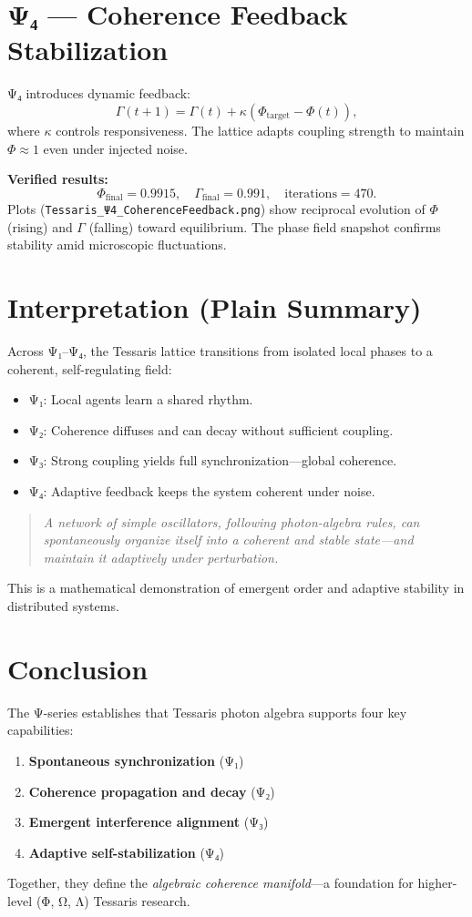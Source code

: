 \documentclass[12pt]{article}
\begin{document}
\section{Ψ₄ — Coherence Feedback Stabilization}
Ψ₄ introduces dynamic feedback:
\[
\Gamma(t+1) = \Gamma(t) + \kappa (\Phi_\text{target} - \Phi(t)),
\]
where $\kappa$ controls responsiveness.
The lattice adapts coupling strength to maintain $\Phi \approx 1$ even under injected noise.

\textbf{Verified results:}
\[
\Phi_\text{final} = 0.9915, \quad \Gamma_\text{final} = 0.991, \quad \text{iterations} = 470.
\]
Plots (\texttt{Tessaris\_Ψ4\_CoherenceFeedback.png}) show reciprocal evolution of $\Phi$ (rising) and $\Gamma$ (falling) toward equilibrium.
The phase field snapshot confirms stability amid microscopic fluctuations.

\section{Interpretation (Plain Summary)}
Across Ψ₁–Ψ₄, the Tessaris lattice transitions from isolated local phases to a coherent, self-regulating field:
\begin{itemize}
    \item Ψ₁: Local agents learn a shared rhythm.  
    \item Ψ₂: Coherence diffuses and can decay without sufficient coupling.  
    \item Ψ₃: Strong coupling yields full synchronization—global coherence.  
    \item Ψ₄: Adaptive feedback keeps the system coherent under noise.
\end{itemize}

\begin{quote}
\emph{A network of simple oscillators, following photon-algebra rules, can spontaneously organize itself into a coherent and stable state—and maintain it adaptively under perturbation.}
\end{quote}

This is a mathematical demonstration of emergent order and adaptive stability in distributed systems.

\section{Conclusion}
The Ψ-series establishes that Tessaris photon algebra supports four key capabilities:
\begin{enumerate}
    \item \textbf{Spontaneous synchronization} (Ψ₁)
    \item \textbf{Coherence propagation and decay} (Ψ₂)
    \item \textbf{Emergent interference alignment} (Ψ₃)
    \item \textbf{Adaptive self-stabilization} (Ψ₄)
\end{enumerate}
Together, they define the \emph{algebraic coherence manifold}—a foundation for higher-level (Φ, Ω, Λ) Tessaris research.
\end{document}
